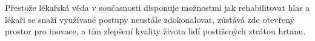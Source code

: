 Přestože lékařská věda v současnosti disponuje možnostmi jak rehabilitovat hlas a lékaři se snaží využívané postupy neustále zdokonalovat, zůstává zde otevřený prostor pro inovace, a tím zlepšení kvality života lidí postižených ztrátou hrtanu.
%
%
%


